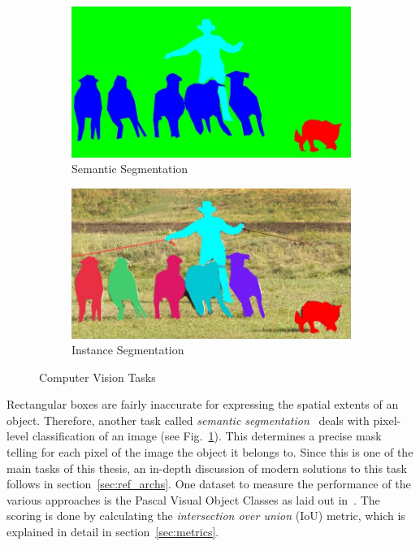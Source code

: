 \begin{figure}
    \begin{subfigure}{\VisionTasksImageWidth}
        \includegraphics[width=\textwidth]{images/vision_task_3}
        \caption{Semantic Segmentation}
        \label{fig:cv_task_semseg}
    \end{subfigure}
    \hspace{5mm}
    \begin{subfigure}{\VisionTasksImageWidth}
        \includegraphics[width=\textwidth]{images/vision_task_4}
        \caption{Instance Segmentation}
        \label{fig:cv_task_inseg}
    \end{subfigure}

    \caption[Computer Vision Tasks]{Computer Vision Tasks~\cite{coco14}}
    \label{fig:cv_tasks}
\end{figure}

Rectangular boxes are fairly inaccurate for expressing the spatial extents of an object. Therefore, another task called \emph{semantic segmentation}~\cite{weakseg15} deals with pixel-level classification of an image (see Fig.~\ref{fig:cv_task_semseg}). This determines a precise mask telling for each pixel of the image the object it belongs to. Since this is one of the main tasks of this thesis, an in-depth discussion of modern solutions to this task follows in section~\ref{sec:ref_archs}. One dataset to measure the performance of the various approaches is the Pascal Visual Object Classes as laid out in~\cite{pascal_voc15}. The scoring is done by calculating the \emph{intersection over union} (IoU) metric, which is explained in detail in section~\ref{sec:metrics}.

